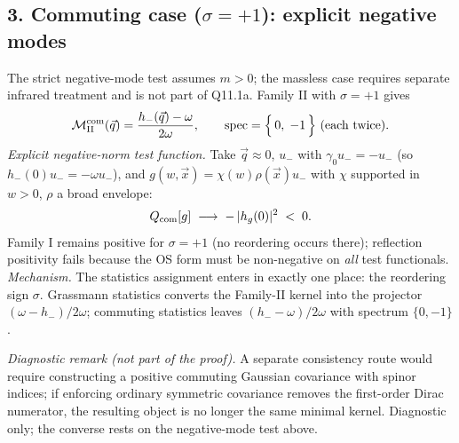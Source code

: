 \subsection*{3. Commuting case ($\sigma=+1$): explicit negative
modes}
The strict negative-mode test assumes $m>0$; the massless case
requires separate infrared treatment and is not part of Q11.1a.
Family II with $\sigma=+1$ gives
\[
\mathcal M_{\rm II}^{\rm com}(\vec q)
=\frac{h_-(\vec q)-\omega}{2\omega},
\qquad
\mathrm{spec}=\Bigl\{\,0,\;-1\,\Bigr\}\ \text{(each twice)} .
\]
\emph{Explicit negative-norm test function.}
Take $\vec q\approx0$, $u_-$ with $\gamma_0u_-=-u_-$
(so $h_-(0)u_-=-\omega u_-$), and
$g(w,\vec x)=\chi(w)\rho(\vec x)u_-$ with $\chi$ supported in
$w>0$, $\rho$ a broad envelope:
\[
Q_{\rm com}[g]\;\longrightarrow\;-\,|h_g(0)|^2\;<\;0 .
\]
Family I remains positive for $\sigma=+1$ (no reordering occurs
there); reflection positivity fails because the OS form must be
non-negative on \emph{all} test functionals.
\emph{Mechanism.}
The statistics assignment enters in exactly one place: the
reordering sign $\sigma$.
Grassmann statistics converts the Family-II kernel into the
projector $(\omega-h_-)/2\omega$; commuting statistics leaves
$(h_--\omega)/2\omega$ with spectrum $\{0,-1\}$.

\emph{Diagnostic remark (not part of the proof).}
A separate consistency route would require constructing a positive
commuting Gaussian covariance with spinor indices; if enforcing
ordinary symmetric covariance removes the first-order Dirac
numerator, the resulting object is no longer the same minimal
kernel.
Diagnostic only; the converse rests on the negative-mode test
above.

